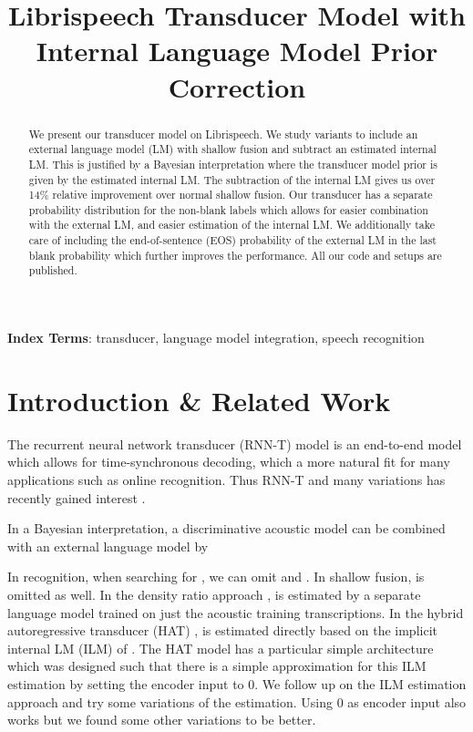 \documentclass[a4paper]{article}
\title{Librispeech Transducer Model with Internal Language Model Prior Correction}
\begin{document}
\maketitle
\begin{abstract}
We present our transducer model on Librispeech.
We study variants to include an external language model (LM)
with shallow fusion
and subtract an estimated internal LM.
This is justified by a Bayesian interpretation
where the transducer model prior is given by the estimated internal LM.
The subtraction of the internal LM gives us over 14\% relative improvement
over normal shallow fusion.
Our transducer has a separate probability distribution
for the non-blank labels
which allows for easier combination with the external LM,
and easier estimation of the internal LM.
We additionally take care of including the end-of-sentence (EOS) probability
of the external LM in the last blank probability
which further improves the performance.
All our code and setups are published.
\end{abstract}
\noindent\textbf{Index Terms}: transducer, language model integration, speech recognition

\section{Introduction \& Related Work}

The recurrent neural network transducer (RNN-T) model
\cite{graves2012seqtransduction,graves2013speechrnnt}
is an end-to-end model which allows for time-synchronous decoding,
which a more natural fit for many applications such as online recognition.
Thus
RNN-T and many variations has recently gained interest
\cite{zhang2020trafotransducer,han2020contextnet,gulati2020conformer,variani2020hat,zeyer2020:transducer,zhou2021phonemetransducer}.

In a Bayesian interpretation,
a discriminative acoustic model 
can be combined with an external language model 
by

In recognition, when searching for ,
we can omit  and .
In shallow fusion,  is omitted as well.
In the density ratio approach \cite{mcdermott2019density},
 is estimated by a separate language model
trained on just the acoustic training transcriptions.
In the hybrid autoregressive transducer (HAT) \cite{variani2020hat},
 is estimated directly based on the implicit internal LM (ILM)
of .
The HAT model has a particular simple architecture
which was designed such that there is a simple approximation
for this ILM estimation by setting the encoder input to 0.
We follow up on the ILM estimation approach
and try some variations of the estimation.
Using 0 as encoder input also works
but we found some other variations to be better.
\end{document}
